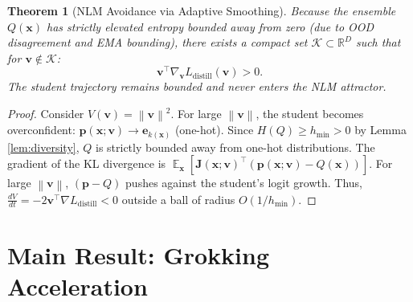 \documentclass[11pt,a4paper]{article}
\theoremstyle{definition}
\theoremstyle{plain}
\newtheorem{theorem}{Theorem}[section]
\theoremstyle{remark}
\DeclareMathOperator{\E}{\mathbb{E}}
\newcommand{\R}{\mathbb{R}}
\newcommand{\vvec}{\mathbf{v}}
\newcommand{\x}{\mathbf{x}}
\newcommand{\p}{\mathbf{p}}
\newcommand{\norm}[1]{\left\|#1\right\|}
\begin{document}
\begin{theorem}[NLM Avoidance via Adaptive Smoothing]
\label{thm:nlm-avoidance}
Because the ensemble $Q(\x)$ has strictly elevated entropy bounded away from zero (due to OOD disagreement and EMA bounding), there exists a compact set $\mathcal{K} \subset \R^D$ such that for $\vvec \notin \mathcal{K}$:
\[
\vvec^\top \nabla_{\vvec} L_{\text{distill}}(\vvec) > 0.
\]
The student trajectory remains bounded and never enters the NLM attractor.
\end{theorem}
\begin{proof}
Consider $V(\vvec) = \norm{\vvec}^2$. For large $\norm{\vvec}$, the student becomes overconfident: $\p(\x; \vvec) \to \mathbf{e}_{k(\x)}$ (one-hot). Since $H(Q) \geq h_{\min} > 0$ by Lemma \ref{lem:diversity}, $Q$ is strictly bounded away from one-hot distributions. The gradient of the KL divergence is $\E_{\x}[\mathbf{J}(\x; \vvec)^\top (\p(\x; \vvec) - Q(\x))]$.
For large $\norm{\vvec}$, $(\p - Q)$ pushes against the student's logit growth. Thus, $\frac{dV}{dt} = -2\vvec^\top \nabla L_{\text{distill}} < 0$ outside a ball of radius $O(1/h_{\min})$.
\end{proof}

\section{Main Result: Grokking Acceleration}
\label{sec:main}
\end{document}
